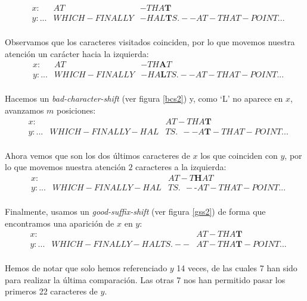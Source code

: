 \begin{align*} 
&x:     &        		 AT&-THA\textbf{T}\\
&y: ... & WHICH-FINALLY&-HAL\textbf{T}S.--AT-THAT-POINT ...\\
\end{align*}

Observamos que los caracteres visitados coinciden, por lo que movemos nuestra atención un carácter hacia la izquierda:\\

\begin{align*} 
&x:     &        		 AT&-TH\textbf{A}T\\
&y: ... & WHICH-FINALLY&-HA\textbf{L}TS.--AT-THAT-POINT ...\\
\end{align*}

Hacemos un \textit{bad-character-shift} (ver figura \ref{bcs2}) y, como `L' no aparece en $x$, avanzamos $m$ posiciones:\\

\begin{align*} 
&x:     &        					 &AT-THA\textbf{T}\\
&y: ... & WHICH-FINALLY-HAL&TS.\ \ --A\textbf{T}-THAT-POINT ...\\
\end{align*}

Ahora vemos que son los dos últimos caracteres de $x$ los que coinciden con $y$, por lo que movemos nuestra atención $2$ caracteres a la izquierda:\\

\begin{align*} 
&x:     &        					 &AT-T\textbf{H}AT\\
&y: ... & WHICH-FINALLY-HAL&TS.\ \ -\textbf{-}AT-THAT-POINT ...\\
\end{align*}

Finalmente, usamos un \textit{good-suffix-shift} (ver figura \ref{gss2}) de forma que encontramos una aparición de $x$ en $y$:\\

\begin{align*} 
&x:     &        				     	  &AT-THA\textbf{T}\\
&y: ... & WHICH-FINALLY-HALTS.--&AT-THA\textbf{T}-POINT ...\\
\end{align*}

Hemos de notar que solo hemos referenciado $y$ 14 veces, de las cuales 7 han sido para realizar la última comparación. Las otras 7 nos han permitido pasar los primeros 22 caracteres de $y$.

